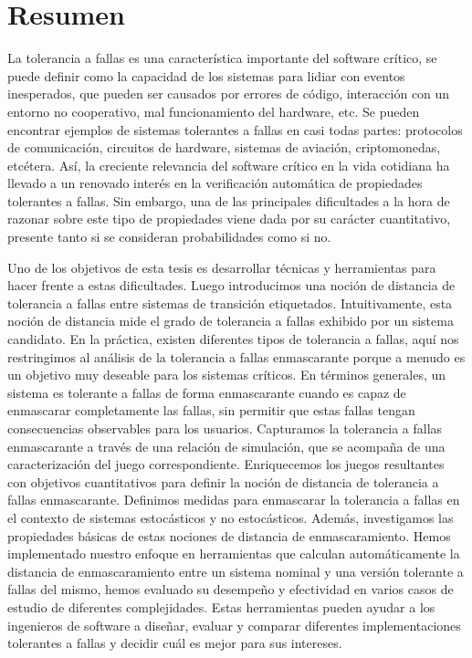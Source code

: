 \chapter*{Resumen}

La tolerancia a fallas es una característica importante del software crítico, se puede definir como la capacidad de los sistemas para lidiar con eventos inesperados, que pueden ser causados por errores de código, interacción con un entorno no cooperativo,
mal funcionamiento del hardware, etc.
Se pueden encontrar ejemplos de sistemas tolerantes a fallas en casi todas partes:
protocolos de comunicación, circuitos de hardware, sistemas de aviación,
criptomonedas, etcétera.
Así, la creciente relevancia del software crítico en
la vida cotidiana ha llevado a un renovado interés en la verificación automática de propiedades tolerantes a fallas. Sin embargo, una de las principales dificultades a la hora de razonar sobre este tipo de propiedades viene dada por su carácter cuantitativo, presente tanto si se consideran probabilidades como si no.

Uno de los objetivos de esta tesis es desarrollar técnicas y herramientas para hacer frente a estas dificultades.
Luego introducimos una noción de distancia de tolerancia a fallas entre sistemas de transición etiquetados. Intuitivamente, esta noción de distancia mide el grado de tolerancia a fallas exhibido por un sistema candidato.
En la práctica, existen diferentes tipos de tolerancia a fallas, aquí nos restringimos al análisis de la tolerancia a fallas enmascarante porque a menudo es un objetivo muy deseable para los sistemas críticos.
En términos generales, un sistema es tolerante a fallas de forma enmascarante cuando es capaz de enmascarar completamente las fallas, sin permitir que estas fallas tengan consecuencias observables para los usuarios.
Capturamos la tolerancia a fallas enmascarante a través de una relación de simulación, que se acompaña de una caracterización del juego correspondiente.
Enriquecemos los juegos resultantes con objetivos cuantitativos para
definir la noción de distancia de tolerancia a fallas enmascarante.
Definimos medidas para enmascarar la tolerancia a fallas en el contexto de sistemas estocásticos y no estocásticos. Además, investigamos las propiedades básicas de estas nociones de distancia de enmascaramiento.
Hemos implementado nuestro enfoque en herramientas que calculan automáticamente la distancia de enmascaramiento entre un sistema nominal y una versión tolerante a fallas del mismo, hemos evaluado su desempeño y efectividad en varios casos de estudio de diferentes complejidades.
Estas herramientas pueden ayudar a los ingenieros de software a diseñar, evaluar y comparar diferentes implementaciones tolerantes a fallas y decidir cuál es mejor para sus intereses.

